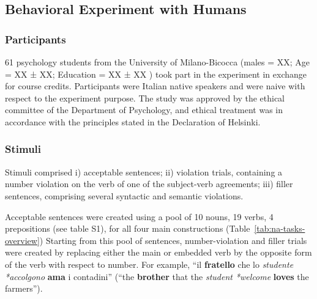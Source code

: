
\subsection{Behavioral Experiment with Humans}
\subsubsection{Participants}
61 psychology students from the University of Milano-Bicocca (males = XX; Age = XX ± XX; Education = XX ± XX ) took part in the experiment in exchange for course credits. 
Participants were Italian native speakers and were naive with respect to the experiment purpose. 
The study was approved by the ethical committee of the Department of Psychology, and ethical treatment was in accordance with the principles stated in the Declaration of Helsinki.

\subsubsection{Stimuli}
Stimuli comprised i) acceptable sentences; ii) violation trials, containing a number violation on the verb of one of the subject-verb agreements; iii) filler sentences, comprising several syntactic and semantic violations. 

Acceptable sentences were created using a pool of 10 nouns, 19 verbs, 4 prepositions (see table S1), for all four main constructions (Table~\ref{tab:na-tasks-overview})
Starting from this pool of sentences, number-violation and filler trials were created by replacing either the main or embedded verb by the opposite form of the verb with respect to number. For example, ``il \textbf{fratello} che lo \emph{studente *accolgono} \textbf{ama} i contadini'' (``the \textbf{brother} that the \emph{student *welcome} \textbf{loves} the farmers'').

